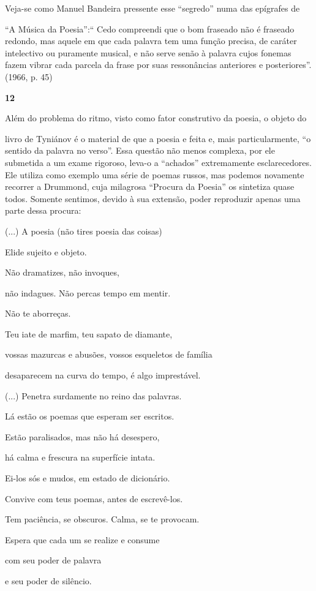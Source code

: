 Veja-se como Manuel Bandeira pressente esse ``segredo'' numa das
epígrafes de

``A Música da Poesia'':`` Cedo compreendi que o bom fraseado não é
fraseado redondo, mas aquele em que cada palavra tem uma função precisa,
de caráter intelectivo ou puramente musical, e não serve senão à palavra
cujos fonemas fazem vibrar cada parcela da frase por suas ressonâncias
anteriores e posteriores''. (1966, p. 45)

\textbf{12}

Além do problema do ritmo, visto como fator construtivo da poesia, o
objeto do

livro de Tyniánov é o material de que a poesia e feita e, mais
particularmente, ``o sentido da palavra no verso''. Essa questão não
menos complexa, por ele submetida a um exame rigoroso, leva-o a
``achados'' extremamente esclarecedores. Ele utiliza como exemplo uma
série de poemas russos, mas podemos novamente recorrer a Drummond, cuja
milagrosa ``Procura da Poesia'' os sintetiza quase todos. Somente
sentimos, devido à sua extensão, poder reproduzir apenas uma parte dessa
procura:

(...) A poesia (não tires poesia das coisas)

Elide sujeito e objeto.

Não dramatizes, não invoques,

não indagues. Não percas tempo em mentir.

Não te aborreças.

Teu iate de marfim, teu sapato de diamante,

vossas mazurcas e abusões, vossos esqueletos de família

desaparecem na curva do tempo, é algo imprestável.

(...) Penetra surdamente no reino das palavras.

Lá estão os poemas que esperam ser escritos.

Estão paralisados, mas não há desespero,

há calma e frescura na superfície intata.

Ei-los sós e mudos, em estado de dicionário.

Convive com teus poemas, antes de escrevê-los.

Tem paciência, se obscuros. Calma, se te provocam.

Espera que cada um se realize e consume

com seu poder de palavra

e seu poder de silêncio.

